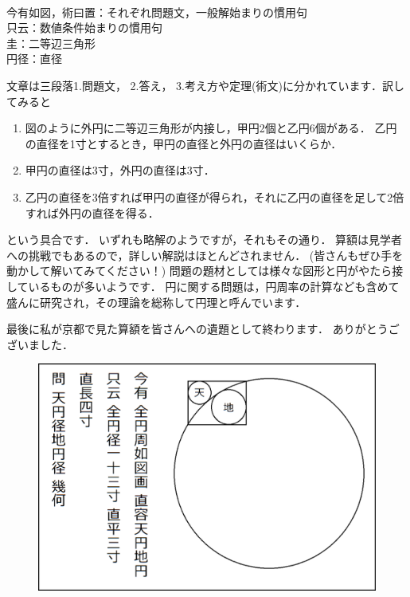 \documentclass[./main]{subfiles}
\begin{document}
\begin{flushleft}
[用語] \\
今有如図，術曰置：それぞれ問題文，一般解始まりの慣用句 \\
只云：数値条件始まりの慣用句 \\
圭：二等辺三角形 \\
円径：直径
\end{flushleft}

文章は三段落1.問題文， 2.答え， 3.考え方や定理(術文)に分かれています．訳してみると

\begin{enumerate}
\item 図のように外円に二等辺三角形が内接し，甲円2個と乙円6個がある． 乙円の直径を1寸とするとき，甲円の直径と外円の直径はいくらか．
\item 甲円の直径は3寸，外円の直径は3寸．
\item 乙円の直径を3倍すれば甲円の直径が得られ，それに乙円の直径を足して2倍すれば外円の直径を得る．
\end{enumerate}
という具合です． いずれも略解のようですが，それもその通り． 算額は見学者への挑戦でもあるので，詳しい解説はほとんどされません． (皆さんもぜひ手を動かして解いてみてください！)
問題の題材としては様々な図形と円がやたら接しているものが多いようです． 円に関する問題は，円周率の計算なども含めて盛んに研究され，その理論を総称して円理と呼んでいます．

最後に私が京都で見た算額を皆さんへの遺題として終わります． ありがとうございました．

\begin{figure}[H]
\begin{center}
\includegraphics[width=13cm]{ookuwa4.png}
\end{center}
\end{figure}
\end{document}
